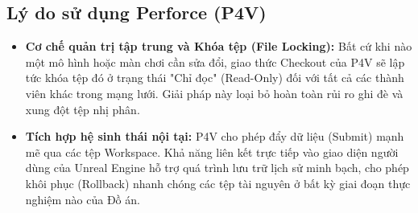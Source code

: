 \documentclass[../DoAn.tex]{subfiles}
\begin{document}
\subsection{Lý do sử dụng Perforce (P4V)}
\begin{itemize}
    \item \textbf{Cơ chế quản trị tập trung và Khóa tệp (File Locking):} Bất cứ khi nào một mô hình hoặc màn chơi cần sửa đổi, giao thức Checkout của P4V sẽ lập tức khóa tệp đó ở trạng thái "Chỉ đọc" (Read-Only) đối với tất cả các thành viên khác trong mạng lưới. Giải pháp này loại bỏ hoàn toàn rủi ro ghi đè và xung đột tệp nhị phân.
    \item \textbf{Tích hợp hệ sinh thái nội tại:} P4V cho phép đẩy dữ liệu (Submit) mạnh mẽ qua các tệp Workspace. Khả năng liên kết trực tiếp vào giao diện người dùng của Unreal Engine hỗ trợ quá trình lưu trữ lịch sử minh bạch, cho phép khôi phục (Rollback) nhanh chóng các tệp tài nguyên ở bất kỳ giai đoạn thực nghiệm nào của Đồ án.
\end{itemize}
\end{document}
